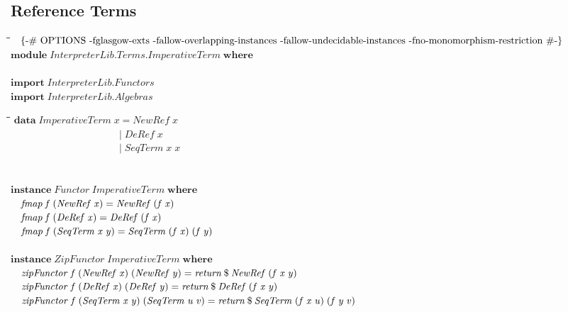 \documentclass[10pt]{article}
\newlength{\lwidth}\setlength{\lwidth}{4.5cm}
\newlength{\cwidth}\setlength{\cwidth}{8mm} %
\newcommand{\Conid}[1]{\mathit{#1}}
\newcommand{\Varid}[1]{\mathit{#1}}
\begin{document}
\subsection{Reference Terms}
\begin{tabbing}
\qquad\=\hspace{\lwidth}\=\hspace{\cwidth}\=\+\kill
${\mbox{\enskip\{-\# OPTIONS -fglasgow-exts -fallow-overlapping-instances -fallow-undecidable-instances -fno-monomorphism-restriction  \#-\}\enskip}}$\\
${\mathbf{module}\;\Conid{\Conid{InterpreterLib}.\Conid{Terms}.ImperativeTerm}\;\mathbf{where}}$\\
${}$\\
${\mathbf{import}\;\Conid{\Conid{InterpreterLib}.Functors}}$\\
${\mathbf{import}\;\Conid{\Conid{InterpreterLib}.Algebras}}$
\end{tabbing}
\begin{tabbing}
\qquad\=\hspace{\lwidth}\=\hspace{\cwidth}\=\+\kill
${\mathbf{data}\;\Conid{ImperativeTerm}\;\Varid{x}\mathrel{=}\Conid{NewRef}\;\Varid{x}}$\\
${\phantom{\mathbf{data}\;\Conid{ImperativeTerm}\;\Varid{x}\mbox{}}\mid \Conid{DeRef}\;\Varid{x}}$\\
${\phantom{\mathbf{data}\;\Conid{ImperativeTerm}\;\Varid{x}\mbox{}}\mid \Conid{SeqTerm}\;\Varid{x}\;\Varid{x}}$\\
${}$\\
${}$\\
${\mathbf{instance}\;\Conid{Functor}\;\Conid{ImperativeTerm}\;\mathbf{where}}$\\
${\hskip1.00em\relax\Varid{fmap}\;\Varid{f}\;(\Conid{NewRef}\;\Varid{x})\mathrel{=}\Conid{NewRef}\;(\Varid{f}\;\Varid{x})}$\\
${\hskip1.00em\relax\Varid{fmap}\;\Varid{f}\;(\Conid{DeRef}\;\Varid{x})\mathrel{=}\Conid{DeRef}\;(\Varid{f}\;\Varid{x})}$\\
${\hskip1.00em\relax\Varid{fmap}\;\Varid{f}\;(\Conid{SeqTerm}\;\Varid{x}\;\Varid{y})\mathrel{=}\Conid{SeqTerm}\;(\Varid{f}\;\Varid{x})\;(\Varid{f}\;\Varid{y})}$\\
${}$\\
${\mathbf{instance}\;\Conid{ZipFunctor}\;\Conid{ImperativeTerm}\;\mathbf{where}}$\\
${\hskip1.00em\relax\Varid{zipFunctor}\;\Varid{f}\;(\Conid{NewRef}\;\Varid{x})\;(\Conid{NewRef}\;\Varid{y})\mathrel{=}\Varid{return}\mathbin{\$}\Conid{NewRef}\;(\Varid{f}\;\Varid{x}\;\Varid{y})}$\\
${\hskip1.00em\relax\Varid{zipFunctor}\;\Varid{f}\;(\Conid{DeRef}\;\Varid{x})\;(\Conid{DeRef}\;\Varid{y})\mathrel{=}\Varid{return}\mathbin{\$}\Conid{DeRef}\;(\Varid{f}\;\Varid{x}\;\Varid{y})}$\\
${\hskip1.00em\relax\Varid{zipFunctor}\;\Varid{f}\;(\Conid{SeqTerm}\;\Varid{x}\;\Varid{y})\;(\Conid{SeqTerm}\;\Varid{u}\;\Varid{v})\mathrel{=}\Varid{return}\mathbin{\$}\Conid{SeqTerm}\;(\Varid{f}\;\Varid{x}\;\Varid{u})\;(\Varid{f}\;\Varid{y}\;\Varid{v})}$
\end{tabbing}
\end{document}
